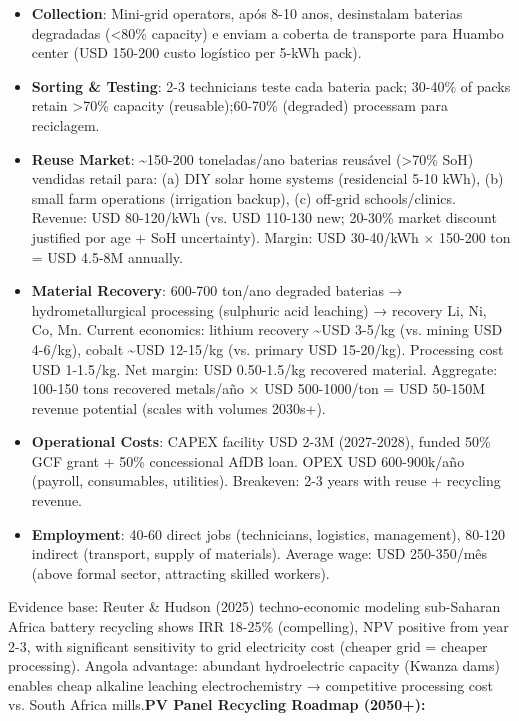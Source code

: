 \documentclass[12pt, a4paper]{article}
\begin{document}
\begin{itemize}
\item\textbf{Collection}: Mini-grid operators, após 8-10 anos, desinstalam baterias degradadas (<80\% capacity) e enviam a coberta de transporte para Huambo center (USD 150-200 custo logístico per 5-kWh pack).

\item\textbf{Sorting \& Testing}: 2-3 technicians teste cada bateria pack; 30-40\% of packs retain >70\% capacity (reusable);60-70\% (degraded) processam para reciclagem.

\item\textbf{Reuse Market}: \textasciitilde{}150-200 toneladas/ano baterias reusável (>70\% SoH) vendidas retail para: (a) DIY solar home systems (residencial 5-10 kWh), (b) small farm operations (irrigation backup), (c) off-grid schools/clinics. Revenue: USD 80-120/kWh (vs. USD 110-130 new; 20-30\% market discount justified por age + SoH uncertainty). Margin: USD 30-40/kWh × 150-200 ton = USD 4.5-8M annually.

\item\textbf{Material Recovery}: 600-700 ton/ano degraded baterias → hydrometallurgical processing (sulphuric acid leaching) → recovery Li, Ni, Co, Mn. Current economics: lithium recovery \textasciitilde{}USD 3-5/kg (vs. mining USD 4-6/kg), cobalt \textasciitilde{}USD 12-15/kg (vs. primary USD 15-20/kg). Processing cost USD 1-1.5/kg. Net margin: USD 0.50-1.5/kg recovered material. Aggregate: 100-150 tons recovered metals/año × USD 500-1000/ton = USD 50-150M revenue potential (scales with volumes 2030s+).

\item\textbf{Operational Costs}: CAPEX facility USD 2-3M (2027-2028), funded 50\% GCF grant + 50\% concessional AfDB loan. OPEX USD 600-900k/año (payroll, consumables, utilities). Breakeven: 2-3 years with reuse + recycling revenue.

\item\textbf{Employment}: 40-60 direct jobs (technicians, logistics, management), 80-120 indirect (transport, supply of materials). Average wage: USD 250-350/mês (above formal sector, attracting skilled workers).
\end{itemize}

Evidence base: Reuter \& Hudson (2025) techno-economic modeling sub-Saharan Africa battery recycling shows IRR 18-25\% (compelling), NPV positive from year 2-3, with significant sensitivity to grid electricity cost (cheaper grid = cheaper processing). Angola advantage: abundant hydroelectric capacity (Kwanza dams) enables cheap alkaline leaching electrochemistry → competitive processing cost vs. South Africa mills.\textbf{PV Panel Recycling Roadmap (2050+):}
\end{document}
